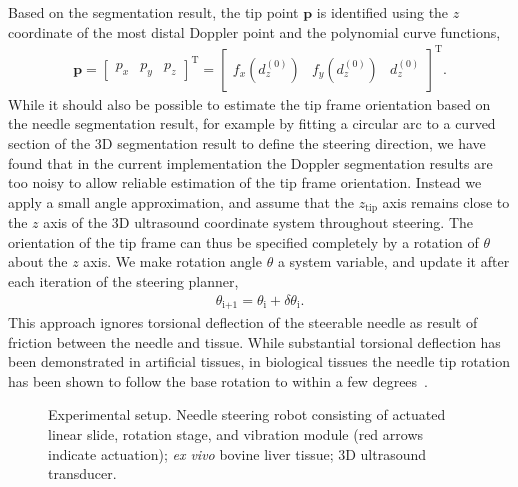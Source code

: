 Based on the segmentation result, the tip point $\bm{p}$ is identified using the $z$ coordinate of the most distal Doppler point and the polynomial curve functions,
\begin{align}
\bm{p} = \begin{bmatrix}p_x & p_y & p_z\end{bmatrix}^{\text{T}} = \begin{bmatrix}f_x(d^{(0)}_z) & f_y(d^{(0)}_z) & d^{(0)}_z \end{bmatrix}^{\text{T}}.
\end{align}
While it should also be possible to estimate the tip frame orientation based on the needle segmentation result, for example by fitting a circular arc to a curved section of the 3D segmentation result to define the steering direction, we have found that in the current implementation the Doppler segmentation results are too noisy to allow reliable estimation of the tip frame orientation. Instead we apply a small angle approximation, and assume that the $z_{\text{tip}}$ axis remains close to the $z$ axis of the 3D ultrasound coordinate system throughout steering. The orientation of the tip frame can thus be specified completely by a rotation of $\theta$ about the $z$ axis. We make rotation angle $\theta$ a system variable, and update it after each iteration of the steering planner, 
\begin{align}
\theta_\text{i+1} = \theta_\text{i} + \delta\theta_\text{i}.
\end{align}
This approach ignores torsional deflection of the steerable needle as result of friction between the needle and tissue. While substantial torsional deflection has been demonstrated in artificial tissues, in biological tissues the needle tip rotation has been shown to follow the base rotation to within a few degrees~\cite{Reed2008}. 

\begin{figure}[!t]
\caption[Experimental setup]{Experimental setup. Needle steering robot consisting of actuated linear slide, rotation stage, and vibration module (red arrows indicate actuation); \textit{ex vivo} bovine liver tissue; 3D ultrasound transducer.}
\label{fig:ExperimentalSetup}
\end{figure}

